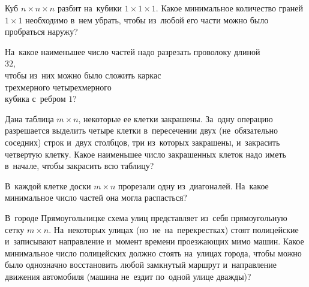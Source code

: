 


\begin{problems}

\item
Куб $n \times n \times n$ разбит на~кубики $1 \times 1 \times 1$.
Какое минимальное количество граней $1 \times 1$ необходимо в~нем убрать, чтобы
из~любой его части можно было пробраться наружу?

\item
На~какое наименьшее число частей надо разрезать проволоку длиной
\\
 \hphantom{трехмерного}
\qquad
{} $32$,
\\
чтобы из~них можно было сложить каркас
\\
 трехмерного
\qquad
{} четырехмерного
\\
кубика с~ребром $1$?
\begin{center}
\qquad
\end{center}


\item
Дана таблица $m \times n$, некоторые ее клетки закрашены.
За~одну операцию разрешается выделить четыре клетки в~пересечении двух
(не~обязательно соседних) строк и~двух столбцов, три из~которых закрашены,
и~закрасить четвертую клетку.
Какое наименьшее число закрашенных клеток надо иметь в~начале, чтобы закрасить
всю таблицу?

\item
В~каждой клетке доски $m \times n$ прорезали одну из~диагоналей.
На~какое минимальное число частей она могла распасться?

\item
В~городе Прямоугольницке схема улиц представляет из~себя прямоугольную сетку
$m \times n$.
На~некоторых улицах (но~не~на~перекрестках) стоят полицейские и~записывают
направление и~момент времени проезжающих мимо машин.
Какое минимальное число полицейских должно стоять на~улицах города, чтобы можно
было однозначно восстановить любой замкнутый маршрут и~направление движения
автомобиля (машина не~ездит по~одной улице дважды)?


\end{problems}
